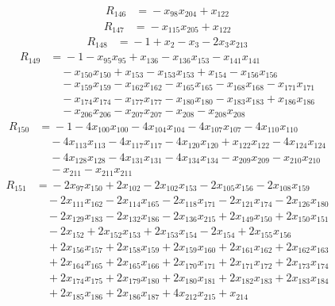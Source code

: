 \begin{align*}
R_{146}&={}-x_{98}x_{204} +x_{122}
\end{align*}
\begin{align*}
R_{147}&={}-x_{115}x_{205} +x_{122}
\end{align*}
\begin{align*}
R_{148}&={}-1 +x_{2} -x_{3} -2x_{3}x_{213}
\end{align*}
\begin{align*}
R_{149}&={}-1 -x_{95}x_{95} +x_{136} -x_{136}x_{153} -x_{141}x_{141}\\
&\quad{}-x_{150}x_{150} +x_{153} -x_{153}x_{153} +x_{154} -x_{156}x_{156}\\
&\quad{}-x_{159}x_{159} -x_{162}x_{162} -x_{165}x_{165} -x_{168}x_{168} -x_{171}x_{171}\\
&\quad{}-x_{174}x_{174} -x_{177}x_{177} -x_{180}x_{180} -x_{183}x_{183} +x_{186}x_{186}\\
&\quad{}-x_{206}x_{206} -x_{207}x_{207} -x_{208} -x_{208}x_{208}
\end{align*}
\begin{align*}
R_{150}&={}-1 -4x_{100}x_{100} -4x_{104}x_{104} -4x_{107}x_{107} -4x_{110}x_{110}\\
&\quad{}-4x_{113}x_{113} -4x_{117}x_{117} -4x_{120}x_{120} +x_{122}x_{122} -4x_{124}x_{124}\\
&\quad{}-4x_{128}x_{128} -4x_{131}x_{131} -4x_{134}x_{134} -x_{209}x_{209} -x_{210}x_{210}\\
&\quad{}-x_{211} -x_{211}x_{211}
\end{align*}
\begin{align*}
R_{151}&={}-2x_{97}x_{150} +2x_{102} -2x_{102}x_{153} -2x_{105}x_{156} -2x_{108}x_{159}\\
&\quad{}-2x_{111}x_{162} -2x_{114}x_{165} -2x_{118}x_{171} -2x_{121}x_{174} -2x_{126}x_{180}\\
&\quad{}-2x_{129}x_{183} -2x_{132}x_{186} -2x_{136}x_{215} +2x_{149}x_{150} +2x_{150}x_{151}\\
&\quad{}-2x_{152} +2x_{152}x_{153} +2x_{153}x_{154} -2x_{154} +2x_{155}x_{156}\\
&\quad{}+2x_{156}x_{157} +2x_{158}x_{159} +2x_{159}x_{160} +2x_{161}x_{162} +2x_{162}x_{163}\\
&\quad{}+2x_{164}x_{165} +2x_{165}x_{166} +2x_{170}x_{171} +2x_{171}x_{172} +2x_{173}x_{174}\\
&\quad{}+2x_{174}x_{175} +2x_{179}x_{180} +2x_{180}x_{181} +2x_{182}x_{183} +2x_{183}x_{184}\\
&\quad{}+2x_{185}x_{186} +2x_{186}x_{187} +4x_{212}x_{215} +x_{214}
\end{align*}
